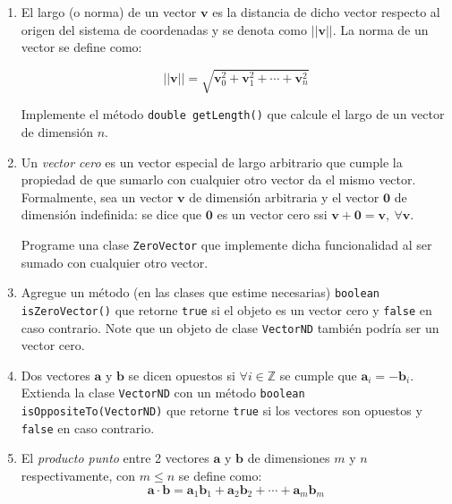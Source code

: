   \begin{Exercise}[title={Algebra vectorial}]
    \begin{enumerate}
      \item El largo (o norma) de un vector \(\mathbf{v}\) es la distancia de dicho vector 
        respecto al origen del sistema de coordenadas y se denota como \(||\mathbf{v}||\).
        La norma de un vector se define como:

        \[  
          ||\mathbf{v}|| = 
            \sqrt{\mathbf{v}_0^2 + \mathbf{v}_1^2 + \cdots + \mathbf{v}_n^2 }
        \]

        Implemente el método \texttt{double getLength()} que calcule el largo de
        un vector de dimensión \(n\). 

      \item Un \textit{vector cero} es un vector especial de largo arbitrario que cumple 
        la propiedad de que sumarlo con cualquier otro vector da el mismo vector.
        Formalmente, sea un vector \(\mathbf{v}\) de dimensión arbitraria y el vector 
        \(\mathbf{0}\) de dimensión indefinida: se dice que \(\mathbf{0}\) es un vector 
        cero ssi \(\mathbf{v} + \mathbf{0} = \mathbf{v},\ \forall \mathbf{v}\).

        Programe una clase \texttt{ZeroVector} que implemente dicha funcionalidad al ser 
        sumado con cualquier otro vector.
      
      \item Agregue un método (en las clases que estime necesarias) 
        \texttt{boolean isZeroVector()} que retorne \texttt{true} si
        el objeto es un vector cero y \texttt{false} en caso contrario.
        Note que un objeto de clase \texttt{VectorND} también podría ser un vector cero.

      \item Dos vectores \(\mathbf{a}\) y \(\mathbf{b}\) se dicen opuestos si 
        \(\forall i \in \mathbb{Z}\) 
        se cumple que \(\mathbf{a}_i = -\mathbf{b}_i\).
        Extienda la clase \texttt{VectorND} con un método 
        \texttt{boolean isOppositeTo(VectorND)} que retorne 
        \texttt{true} si los vectores son opuestos y \texttt{false} 
        en caso contrario.
      
      \item El \textit{producto punto} entre 2 vectores \(\mathbf{a}\) y \(\mathbf{b}\) de 
        dimensiones \(m\) y \(n\) respectivamente, con \(m \leq n\) se define como:
        \[
          \mathbf{a} \cdot \mathbf{b} = \mathbf{a}_1 \mathbf{b}_1 
            + \mathbf{a}_2 \mathbf{b}_2 + \cdots + \mathbf{a}_m \mathbf{b}_m
        \]


\end{enumerate}
\end{Exercise}
